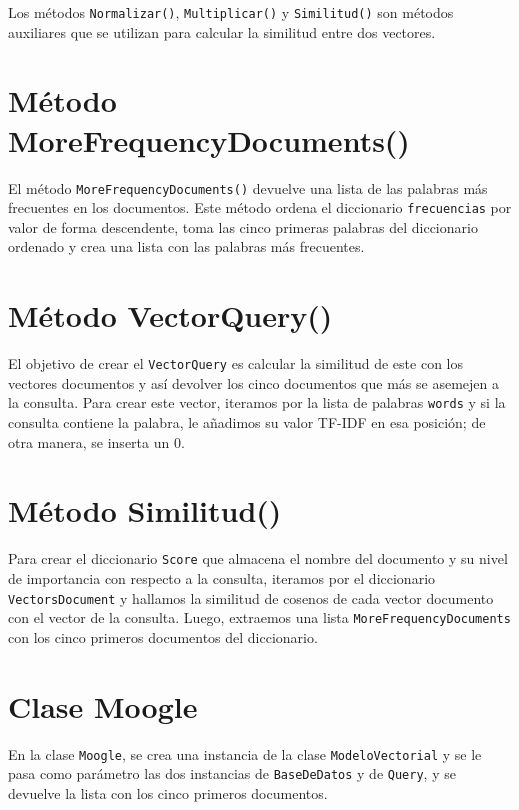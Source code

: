\documentclass{article}
\begin{document}
Los métodos \texttt{Normalizar()}, \texttt{Multiplicar()} y \texttt{Similitud()} son métodos auxiliares que se utilizan para calcular la similitud entre dos vectores.

\section{Método MoreFrequencyDocuments()}

El método \texttt{MoreFrequencyDocuments()} devuelve una lista de las palabras más frecuentes en los documentos. Este método ordena el diccionario \texttt{frecuencias} por valor de forma descendente, toma las cinco primeras palabras del diccionario ordenado y crea una lista con las palabras más frecuentes.

\section{Método VectorQuery()}

El objetivo de crear el \texttt{VectorQuery} es calcular la similitud de este con los vectores documentos y así devolver los cinco documentos que más se asemejen a la consulta. Para crear este vector, iteramos por la lista de palabras \texttt{words} y si la consulta contiene la palabra, le añadimos su valor TF-IDF en esa posición; de otra manera, se inserta un 0.

\section{Método Similitud()}

Para crear el diccionario \texttt{Score} que almacena el nombre del documento y su nivel de importancia con respecto a la consulta, iteramos por el diccionario \texttt{VectorsDocument} y hallamos la similitud de cosenos de cada vector documento con el vector de la consulta. Luego, extraemos una lista \texttt{MoreFrequencyDocuments} con los cinco primeros documentos del diccionario.

\section{{\Huge Clase Moogle}}

En la clase \texttt{Moogle}, se crea una instancia de la clase \texttt{ModeloVectorial} y se le pasa como parámetro las dos instancias de \texttt{BaseDeDatos} y de \texttt{Query}, y se devuelve la lista con los cinco primeros documentos.
\end{document}
